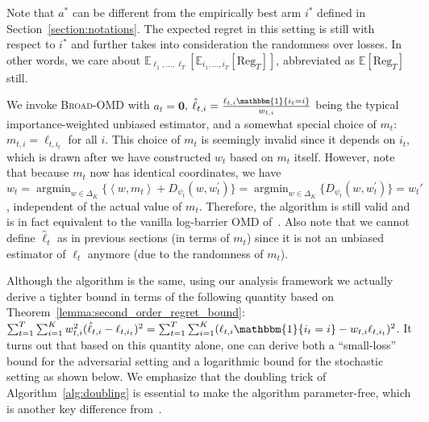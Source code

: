 \documentclass[final, 12pt]{colt2018} %
\newcommand{\p}{\prime}
\DeclareMathOperator*{\argmin}{argmin}
\newcommand{\inner}[1]{ \left\langle {#1} \right\rangle }
\begin{document}
Note that $a^*$ can be different from the empirically best arm $i^*$ defined in Section~\ref{section:notations}. 
The expected regret in this setting is still with respect to $i^*$ and further takes into consideration the randomness over losses. 
In other words, we care about $\mathbb{E}_{\ell_1, \ldots, \ell_T}\left[\mathbb{E}_{i_1, \ldots, i_T}[\text{Reg}_T]\right]$, abbreviated as $\mathbb{E}[\text{Reg}_T]$ still.  

We invoke \textsc{Broad-OMD} with $a_t=\mathbf{0}$, $\hat{\ell}_{t,i}=\frac{\ell_{t,i}\mathbbm{1}\{i_t=i\}}{w_{t,i}}$ being the typical importance-weighted unbiased estimator,
and a somewhat special choice of $m_{t}$: $m_{t,i}=\ell_{t,i_t}$ for all $i$. 
This choice of $m_t$ is seemingly invalid since it depends on $i_t$, which is drawn after we have constructed $w_t$ based on $m_t$ itself.
However, note that because $m_t$ now has identical coordinates, we have
$w_t = \argmin_{w\in\Delta_K} \big\{ \inner{w,m_t} + D_{\psi_t}(w, w_t^\p)\big\} = \argmin_{w\in\Delta_K} \big\{D_{\psi_t}(w, w_t^\p)\big\} = w_t'$, independent of the actual value of $m_t$.
Therefore, the algorithm is still valid and is in fact equivalent to the vanilla log-barrier OMD of~\citep{foster2016learning}.
Also note that we cannot define $\hat{\ell}_{t}$ as in previous sections (in terms of $m_t$) since it is not an unbiased estimator of $\ell_t$ anymore (due to the randomness of $m_t$).


Although the algorithm is the same, using our analysis framework we actually derive a tighter bound in terms of the following quantity based on
Theorem~\ref{lemma:second_order_regret_bound}:
$\sum_{t=1}^T\sum_{i=1}^K w_{t,i}^2(\hat{\ell}_{t,i}-\ell_{t,i_t})^2=\sum_{t=1}^T\sum_{i=1}^K (\ell_{t,i}\mathbbm{1}\{i_t=i\}-w_{t,i}\ell_{t,i_t})^2$.
It turns out that based on this quantity alone, one can derive both a ``small-loss'' bound for the adversarial setting and a logarithmic bound for the stochastic setting
as shown below.
We emphasize that the doubling trick of Algorithm~\ref{alg:doubling} is essential to make the algorithm parameter-free,
which is another key difference from~\citep{foster2016learning}.
\end{document}
